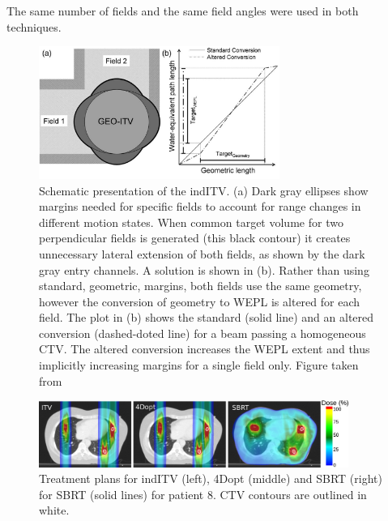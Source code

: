 The same number of fields and the same field angles were used in both techniques.

\begin{figure}[H]
	\begin{center}
		\includegraphics[width=0.7\textwidth]{./ComplexPatients/Images/weplITV.png}
		\caption{Schematic presentation of the indITV. (a) Dark gray ellipses show margins needed for specific fields to account for range changes in different motion states.
		When common target volume for two perpendicular fields is generated (this black contour) it creates unnecessary lateral extension of both fields, as shown by the dark gray
		entry channels. A solution is shown in (b). Rather than using standard, geometric, margins, both fields use the same geometry, however the conversion of geometry to WEPL
		is altered for each field. The plot in (b) shows the standard (solid line) and an altered conversion (dashed-doted line) for a beam passing a homogeneous CTV. The altered conversion
		increases the WEPL extent and thus implicitly increasing margins for a single field only. Figure taken from \cite{Graeff2012}}
		\label{Fig:weplITV}
	\end{center}
\end{figure}
\newpage

\begin{figure}[H]
	\begin{center}
		\includegraphics[width=0.9\textwidth]{./ComplexPatients/Images/multiExample.png}
		\caption{Treatment plans for indITV (left), 4Dopt (middle) and SBRT (right) for SBRT (solid lines) for patient 8. CTV contours are outlined in white.}
		\label{Fig:multiExample}
	\end{center}
\end{figure}

